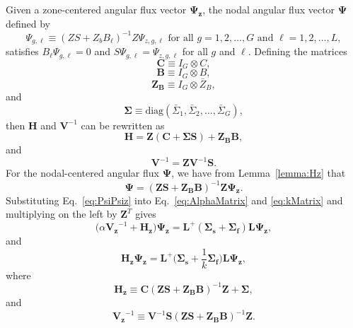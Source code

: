 Given a zone-centered angular flux vector $\mathbf{\Psi_{z}}$, the nodal angular flux vector $\mathbf{\Psi}$ defined by
\begin{equation}
	\Psi_{g,\ell} \equiv (ZS + Z_{b}B_{\ell})^{-1}Z \Psi_{z,g,\ell} \text{ for all } g = 1, 2, \dots, G \text{ and } \ell = 1, 2, \dots, L,
\end{equation}
satisfies $B_{\ell} \Psi_{g,\ell} = 0$ and $S \Psi_{g,\ell} = \Psi_{z,g,\ell}$ for all $g$ and $\ell$. Defining the matrices
\begin{equation}
	\mathbf{C} \equiv I_{G} \otimes C,
\end{equation}
\begin{equation}
	\mathbf{B} \equiv I_{G} \otimes B,
\end{equation}
\begin{equation}
	\mathbf{Z_{B}} \equiv I_{G} \otimes \bar{Z}_{B},
\end{equation}
and
\begin{equation}
	\mathbf{\Sigma} \equiv \text{diag}(\bar{\Sigma}_{1}, \bar{\Sigma}_{2}, \dots, \bar{\Sigma}_{G}),
\end{equation}
then $\mathbf{H}$ and $\mathbf{V}^{-1}$ can be rewritten as
\begin{equation}
	\mathbf{H} = \mathbf{Z}(\mathbf{C} + \mathbf{\Sigma S}) + \mathbf{Z_{B} B},
\end{equation}
and
\begin{equation}
	\mathbf{V}^{-1} = \mathbf{Z}\mathbf{V}^{-1} \mathbf{S}.
\end{equation}
For the nodal-centered angular flux $\mathbf{\Psi}$, we have from Lemma~\ref{lemma:Hz} that
\begin{equation}
	\mathbf{\Psi} = (\mathbf{ZS} + \mathbf{Z_{B}B})^{-1}\mathbf{Z}\mathbf{\Psi_{z}}.
	\label{eq:PsiPsiz}
\end{equation}
Substituting Eq.~\ref{eq:PsiPsiz} into Eq.~\ref{eq:AlphaMatrix} and \ref{eq:kMatrix} and multiplying on the left by $\mathbf{Z}^{T}$ gives
\begin{equation}
	\big ( \alpha \mathbf{V_{z}}^{-1} + \mathbf{H_{z}} \big ) \mathbf{\Psi_{z}} = \mathbf{L}^{+}( \mathbf{\Sigma_{s}} + \mathbf{\Sigma_{f}}) \mathbf{L} \mathbf{\Psi_{z}},
	\label{eq:AlphaZ}
\end{equation}
and
\begin{equation}
	\mathbf{H_{z}} \mathbf{\Psi_{z}} = \mathbf{L}^{+} \bigg ( \mathbf{\Sigma_{s}} + \frac{1}{k}\mathbf{\Sigma_{f}} \bigg ) \mathbf{L} \mathbf{\Psi_{z}},
	\label{eq:kZ}
\end{equation}
where
\begin{equation}
	\mathbf{H_{z}} \equiv \mathbf{C}(\mathbf{ZS} + \mathbf{Z_{B}B})^{-1}\mathbf{Z} + \mathbf{\Sigma},
\end{equation}
and
\begin{equation}
	\mathbf{V_{z}}^{-1} \equiv \mathbf{V}^{-1} \mathbf{S} (\mathbf{ZS} + \mathbf{Z_{B}B})^{-1}\mathbf{Z}.
\end{equation}


